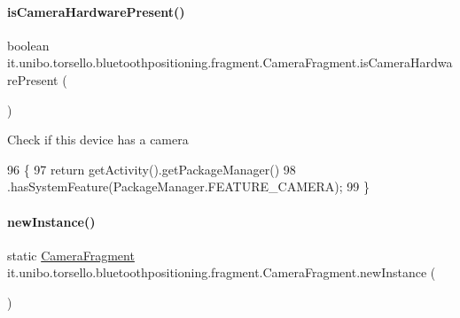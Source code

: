 \paragraph{\texorpdfstring{is\+Camera\+Hardware\+Present()}{isCameraHardwarePresent()}}
{\footnotesize\ttfamily boolean it.\+unibo.\+torsello.\+bluetoothpositioning.\+fragment.\+Camera\+Fragment.\+is\+Camera\+Hardware\+Present (\begin{DoxyParamCaption}{ }\end{DoxyParamCaption})\hspace{0.3cm}{\ttfamily [private]}}

Check if this device has a camera 
\begin{DoxyCode}
96                                               \{
97         \textcolor{keywordflow}{return} getActivity().getPackageManager()
98                 .hasSystemFeature(PackageManager.FEATURE\_CAMERA);
99     \}
\end{DoxyCode}
\hypertarget{classit_1_1unibo_1_1torsello_1_1bluetoothpositioning_1_1fragment_1_1CameraFragment_a06506c839e3206fbe082ab705cb627b5_a06506c839e3206fbe082ab705cb627b5}{}\label{classit_1_1unibo_1_1torsello_1_1bluetoothpositioning_1_1fragment_1_1CameraFragment_a06506c839e3206fbe082ab705cb627b5_a06506c839e3206fbe082ab705cb627b5} 
\paragraph{\texorpdfstring{new\+Instance()}{newInstance()}}
{\footnotesize\ttfamily static \hyperlink{classit_1_1unibo_1_1torsello_1_1bluetoothpositioning_1_1fragment_1_1CameraFragment}{Camera\+Fragment} it.\+unibo.\+torsello.\+bluetoothpositioning.\+fragment.\+Camera\+Fragment.\+new\+Instance (\begin{DoxyParamCaption}{ }\end{DoxyParamCaption})\hspace{0.3cm}{\ttfamily [static]}}


